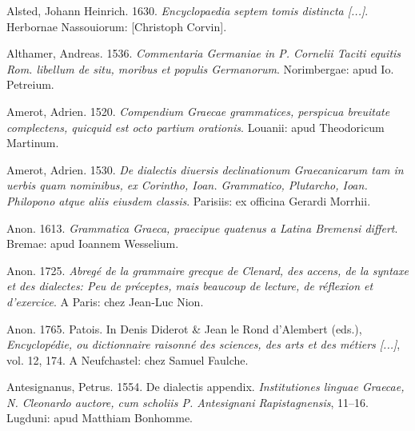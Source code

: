 \begin{styleStandard}
Alsted, Johann Heinrich. 1630. \textit{Encyclopaedia septem tomis distincta [...]}. Herbornae Nassouiorum: [Christoph Corvin].
\end{styleStandard}

\begin{styleStandard}
Althamer, Andreas. 1536. \textit{Commentaria Germaniae in P. Cornelii Taciti equitis Rom. libellum de situ, moribus et populis Germanorum}. Norimbergae: apud Io. Petreium.
\end{styleStandard}

\begin{styleStandard}
Amerot, Adrien. 1520. \textit{Compendium Graecae grammatices, perspicua breuitate complectens, quicquid est octo partium orationis}. Louanii: apud Theodoricum Martinum.
\end{styleStandard}

\begin{styleStandard}
Amerot, Adrien. 1530. \textit{De dialectis diuersis declinationum Graecanicarum tam in uerbis quam nominibus, ex Corintho, Ioan. Grammatico, Plutarcho, Ioan. Philopono atque aliis eiusdem classis}. Parisiis: ex officina Gerardi Morrhii.
\end{styleStandard}

\begin{styleStandard}
Anon. 1613. \textit{Grammatica Graeca, praecipue quatenus a Latina Bremensi differt}. Bremae: apud Ioannem Wesselium.
\end{styleStandard}

\begin{styleStandard}
Anon. 1725. \textit{Abregé de la grammaire grecque de Clenard, des accens, de la syntaxe et des dialectes: Peu de préceptes, mais beaucoup de lecture, de réflexion et d’exercice}. A Paris: chez Jean-Luc Nion.
\end{styleStandard}

\begin{styleStandard}
Anon. 1765. Patois. In Denis Diderot \& Jean le Rond d’Alembert (eds.), \textit{Encyclopédie, ou dictionnaire raisonné des sciences, des arts et des métiers [...]}, vol. 12, 174. A Neufchastel: chez Samuel Faulche.
\end{styleStandard}

\begin{styleStandard}
Antesignanus, Petrus. 1554. De dialectis appendix. \textit{Institutiones linguae Graecae, N. Cleonardo auctore, cum scholiis P. Antesignani Rapistagnensis}, 11–16. Lugduni: apud Matthiam Bonhomme.
\end{styleStandard}

